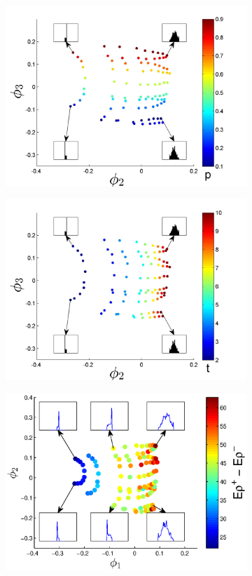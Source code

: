 \documentclass[3p]{elsarticle}
\begin{document}
\begin{figure}[t!]
\begin{subfigure}{\figwidth}
\includegraphics[width=\textwidth]{EMD_withhist_p_400}
\caption{}
\label{subfig:large_lambda_p}
\end{subfigure}
\begin{subfigure}{\figwidth}
\includegraphics[width=\textwidth]{EMD_withhist_t_400}
\caption{}
\label{subfig:large_lambda_t}
\end{subfigure}
\begin{subfigure}{\figwidth}
\includegraphics[width=\textwidth]{EMD_withhist_rho_400}

\end{subfigure}
\end{figure}
\end{document}
